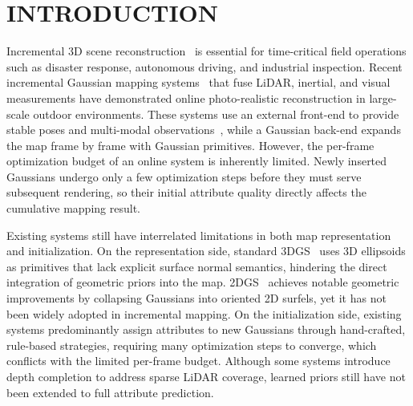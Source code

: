 \documentclass[letterpaper, 10pt, conference]{ieeeconf}
\newcommand{\IEEEPARstart}[2]{#1#2}
\begin{document}

\section{INTRODUCTION}

\IEEEPARstart{I}{ncremental} 3D scene reconstruction~\cite{tosi2024nerfs,sucar2021imap,zhu2022nice,wang2023co} is essential for time-critical field operations such as disaster response, autonomous driving, and industrial inspection. Recent incremental Gaussian mapping systems~\cite{yugay2023gaussian,wu2024mm,zhao2024tclc} that fuse LiDAR, inertial, and visual measurements have demonstrated online photo-realistic reconstruction in large-scale outdoor environments. These systems use an external front-end to provide stable poses and multi-modal observations~\cite{lin2024r,zheng2024fast,lang2023coco}, while a Gaussian back-end expands the map frame by frame with Gaussian primitives. However, the per-frame optimization budget of an online system is inherently limited. Newly inserted Gaussians undergo only a few optimization steps before they must serve subsequent rendering, so their initial attribute quality directly affects the cumulative mapping result.

Existing systems still have interrelated limitations in both map representation and initialization. On the representation side, standard 3DGS~\cite{kerbl20233d} uses 3D ellipsoids as primitives that lack explicit surface normal semantics, hindering the direct integration of geometric priors into the map. 2DGS~\cite{huang20242d} achieves notable geometric improvements by collapsing Gaussians into oriented 2D surfels, yet it has not been widely adopted in incremental mapping. On the initialization side, existing systems predominantly assign attributes to new Gaussians through hand-crafted, rule-based strategies, requiring many optimization steps to converge, which conflicts with the limited per-frame budget. Although some systems introduce depth completion to address sparse LiDAR coverage, learned priors still have not been extended to full attribute prediction.
\end{document}
